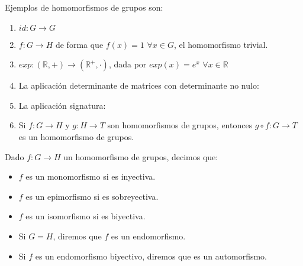 \begin{ejemplo}
    Ejemplos de homomorfismos de grupos son:
    \begin{enumerate}
        \item $id:G\to G$
        \item $f:G\to H$ de forma que $f(x) = 1$ $\forall x\in G$, el homomorfismo trivial.
        \item $exp:(\mathbb{R},+)\to (\mathbb{R}^+,\cdot)$, dada por $exp(x) = e^x$ $\forall x\in \mathbb{R}$
        \item La aplicación determinante de matrices con determinante no nulo:
        \item La aplicación signatura:
        \item Si $f:G\to H$ y $g:H\to T$ son homomorfismos de grupos, entonces $g\circ f:G\to T$ es un homomorfismo de grupos.
    \end{enumerate}
\end{ejemplo}

\begin{definicion}
    Dado $f:G\to H$ un homomorfismo de grupos, decimos que:
    \begin{itemize}
        \item $f$ es un monomorfismo si es inyectiva.
        \item $f$ es un epimorfismo si es sobreyectiva.
        \item $f$ es un isomorfismo si es biyectiva.
        \item Si $G=H$, diremos que $f$ es un endomorfismo.
        \item Si $f$ es un endomorfismo biyectivo, diremos que es un automorfismo.
    \end{itemize}
\end{definicion}

